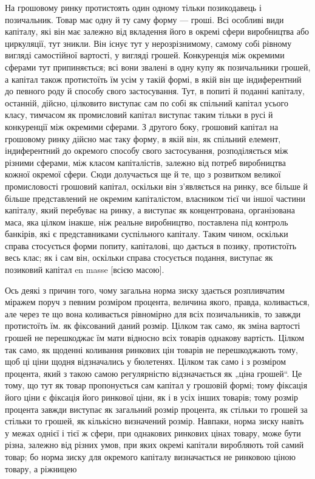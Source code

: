 На грошовому ринку протистоять один одному тільки позикодавець
і позичальник. Товар має одну й ту саму форму —
гроші. Всі особливі види капіталу, які він має залежно від
вкладення його в окремі сфери виробництва або циркуляції,
тут зникли. Він існує тут у нерозрізнимому, самому собі рівному
вигляді самостійної вартості, у вигляді грошей. Конкуренція між
окремими сферами тут припиняється; всі вони звалені в одну купу
як позичальники грошей, а капітал також протистоїть їм усім
у такій формі, в якій він ще індиферентний до певного роду й способу
свого застосування. Тут, в попиті й поданні капіталу, останній,
дійсно, цілковито виступає сам по собі як спільний капітал
усього класу, тимчасом як промисловий капітал виступає
таким тільки в русі й конкуренції між окремими сферами.
З другого боку, грошовий капітал на грошовому ринку дійсно
має таку форму, в якій він, як спільний елемент, індиферентний до
окремого способу свого застосування, розподіляється між різними
сферами, між класом капіталістів, залежно від потреб
виробництва кожної окремої сфери. Сюди долучається ще й те,
що з розвитком великої промисловості грошовий капітал, оскільки
він з’являється на ринку, все більше й більше представлений не
окремим капіталістом, власником тієї чи іншої частини капіталу,
який перебуває на ринку, а виступає як концентрована,
організована маса, яка цілком інакше, ніж реальне виробництво,
поставлена під контроль банкірів, які є представниками суспільного
капіталу. Таким чином, оскільки справа стосується форми попиту,
капіталові, що дається в позику, протистоїть весь клас;
як і сам він, оскільки справа стосується подання, виступає як
позиковий капітал en masse [всією масою].

Ось деякі з причин того, чому загальна норма зиску здається
розпливчатим міражем поруч з певним розміром процента, величина
якого, правда, коливається, але через те що вона коливається
рівномірно для всіх позичальників, то завжди протистоїть
їм. як фіксований даний розмір. Цілком так само, як
зміна вартості грошей не перешкоджає їм мати відносно всіх
товарів однакову вартість. Цілком так само, як щоденні коливання
ринкових цін товарів не перешкоджають тому, щоб ці ціни
щодня відзначались у бюлетенях. Цілком так само і з розміром
процента, який з такою самою регулярністю відзначається як
„ціна грошей“. Це тому, що тут як товар пропонується сам
капітал у грошовій формі; тому фіксація його ціни є фіксація
його ринкової ціни, як і в усіх інших товарів; тому розмір процента
завжди виступає як загальний розмір процента, як
стільки то грошей за стільки то грошей, як кількісно визначений
розмір. Навпаки, норма зиску навіть у межах однієї
і тієї ж сфери, при однакових ринкових цінах товару, може
бути різна, залежно від різних умов, при яких окремі капітали
виробляють той самий товар; бо норма зиску для окремого
капіталу визначається не ринковою ціною товару, а ріжницею
\parbreak{}  %
